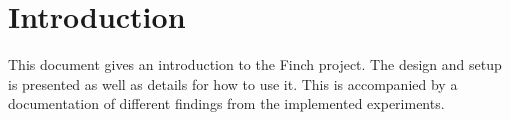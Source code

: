 \section{Introduction}

This document gives an introduction to the Finch project.
The design and setup is presented as well as details for how to use it.
This is accompanied by a documentation of different findings from the implemented experiments.

